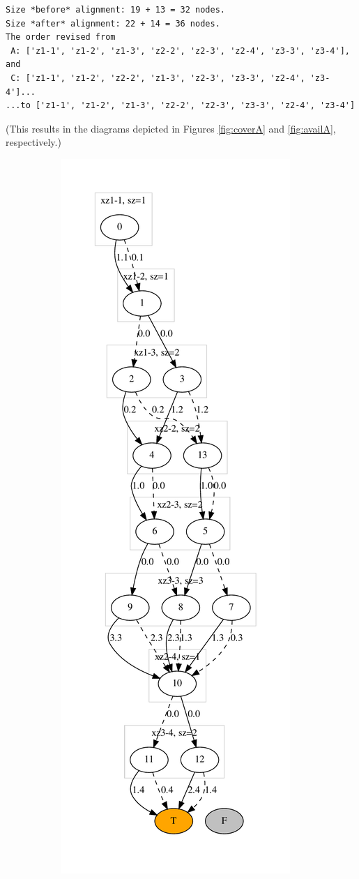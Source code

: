 \documentclass[11pt]{article}
\begin{document}
\begin{verbatim}
Size *before* alignment: 19 + 13 = 32 nodes.
Size *after* alignment: 22 + 14 = 36 nodes.
The order revised from 
 A: ['z1-1', 'z1-2', 'z1-3', 'z2-2', 'z2-3', 'z2-4', 'z3-3', 'z3-4'], and
 C: ['z1-1', 'z1-2', 'z2-2', 'z1-3', 'z2-3', 'z3-3', 'z2-4', 'z3-4']...
...to ['z1-1', 'z1-2', 'z1-3', 'z2-2', 'z2-3', 'z3-3', 'z2-4', 'z3-4']
\end{verbatim}


(This results in the diagrams depicted in Figures \ref{fig:coverA} and \ref{fig:availA}, respectively.)

\begin{figure}[t!]
  \begin{subfigure}[t]{0.45\textwidth}
    \includegraphics[height=\textheight]{./C_aligned.dot.pdf}

\end{subfigure}
\end{figure}
\end{document}
